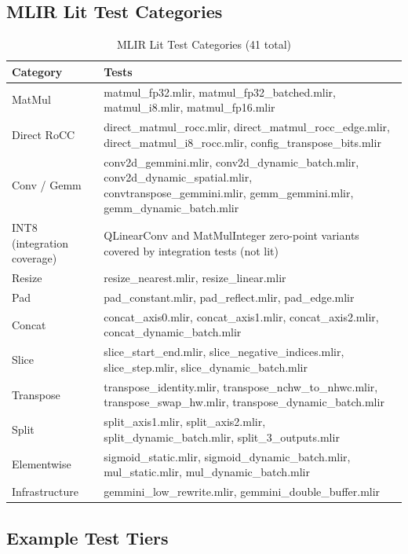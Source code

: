 \documentclass[12pt,a4paper]{article}
\begin{document}
\subsection{MLIR Lit Test Categories}

\begin{table}[H]
\centering
\begin{tabular}{|p{}|p{}|}
\hline
\textbf{Category} & \textbf{Tests} \\
\hline
MatMul & matmul\_fp32.mlir, matmul\_fp32\_batched.mlir, matmul\_i8.mlir, matmul\_fp16.mlir \\
\hline
Direct RoCC & direct\_matmul\_rocc.mlir, direct\_matmul\_rocc\_edge.mlir, direct\_matmul\_i8\_rocc.mlir, config\_transpose\_bits.mlir \\
\hline
Conv / Gemm & conv2d\_gemmini.mlir, conv2d\_dynamic\_batch.mlir, conv2d\_dynamic\_spatial.mlir, convtranspose\_gemmini.mlir, gemm\_gemmini.mlir, gemm\_dynamic\_batch.mlir \\
\hline
INT8 (integration coverage) & QLinearConv and MatMulInteger zero-point variants covered by integration tests (not lit) \\
\hline
Resize & resize\_nearest.mlir, resize\_linear.mlir \\
\hline
Pad & pad\_constant.mlir, pad\_reflect.mlir, pad\_edge.mlir \\
\hline
Concat & concat\_axis0.mlir, concat\_axis1.mlir, concat\_axis2.mlir, concat\_dynamic\_batch.mlir \\
\hline
Slice & slice\_start\_end.mlir, slice\_negative\_indices.mlir, slice\_step.mlir, slice\_dynamic\_batch.mlir \\
\hline
Transpose & transpose\_identity.mlir, transpose\_nchw\_to\_nhwc.mlir, transpose\_swap\_hw.mlir, transpose\_dynamic\_batch.mlir \\
\hline
Split & split\_axis1.mlir, split\_axis2.mlir, split\_dynamic\_batch.mlir, split\_3\_outputs.mlir \\
\hline
Elementwise & sigmoid\_static.mlir, sigmoid\_dynamic\_batch.mlir, mul\_static.mlir, mul\_dynamic\_batch.mlir \\
\hline
Infrastructure & gemmini\_low\_rewrite.mlir, gemmini\_double\_buffer.mlir \\
\hline
\end{tabular}
\caption{MLIR Lit Test Categories (41 total)}
\end{table}

\subsection{Example Test Tiers}
\end{document}
